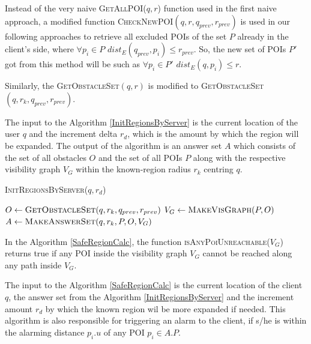 \documentclass{sig-alternate}
\begin{document}
Instead of the very naive \textsc{GetAllPOI}($q, r$) function used in the first naive approach, a modified function \textsc{CheckNewPOI}$(q, r, q_{prev}, r_{prev})$ is used in our following approaches to retrieve all excluded POIs of the set $P$ already in the client's side, where $\forall p_i \in P$ $dist_E(q_{prev}, p_i) \leqslant r_{prev}$. So, the new set of POIs $P'$ got from this method will be such as $\forall p_i \in P'$ $dist_E(q, p_i) \leqslant r$. 

Similarly, the \textsc{GetObstacleSet}$(q, r)$ is modified to \textsc{GetObstacleSet}$(q, r_k, q_{prev}, r_{prev})$.

The input to the Algorithm \ref{InitRegionsByServer} is the current location of the user $q$ and the increment delta $r_d$, which is the amount by which the region will be expanded. The output of the algorithm is an answer set $A$ which consists of the set of all obstacles $O$ and the set of all POIs $P$ along with the respective visibility graph $V_G$ within the known-region radius $r_{k}$ centring $q$.

\begin{algorithm}
\caption{\textsc{InitRegionsByServer}($q,r_d$)}
\label{InitRegionsByServer}

    
	 $O \gets \textsc{GetObstacleSet}(q, r_k, q_{prev}, r_{prev})$\;
	 $V_G \gets \textsc{MakeVisGraph}(P, O)$	\;
	 \Return $A \gets \textsc{MakeAnswerSet}(q, r_k, P, O, V_G)$ 
\end{algorithm}

In the Algorithm \ref{SafeRegionCalc}, the function \textsc{isAnyPoiUnreachable}($V_G$) returns true if any POI inside the visibility graph $V_G$ cannot be reached along any path inside $V_G$.

The input to the Algorithm \ref{SafeRegionCalc} is the current location of the client $q$, the answer set from the Algorithm \ref{InitRegionsByServer} and the increment amount $r_d$ by which the known region wil be more expanded if needed. This algorithm is also responsible for triggering an alarm to the client, if s/he is within the alarming distance $p_i.u$ of any POI $p_i \in A.P$.
\end{document}
